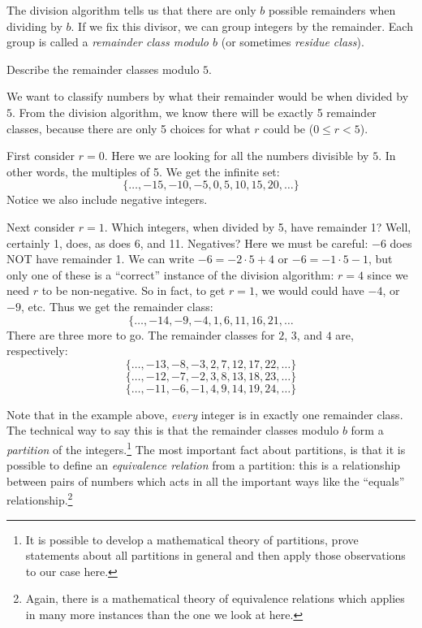\documentclass[12pt]{article}
\begin{document}
The division algorithm tells us that there are only $b$ possible remainders when dividing by $b$.  If we fix this divisor, we can group integers by the remainder. Each group is called a {\em remainder class modulo $b$} (or sometimes {\em residue class}). 

\begin{example}
	Describe the remainder classes modulo $5$.
	
	\begin{solution}
		We want to classify numbers by what their remainder would be when divided by $5$.  From the division algorithm, we know there will be exactly 5 remainder classes, because there are only 5 choices for what $r$ could be ($0 \le r < 5$).
		
		First consider $r = 0$.  Here we are looking for all the numbers divisible by $5$.  In other words, the multiples of 5.  We get the infinite set:
		\[\{\ldots, -15, -10, -5, 0, 5, 10, 15, 20, \ldots\}\]
		Notice we also include negative integers.
		
		Next consider $r = 1$.  Which integers, when divided by 5, have remainder 1?  Well, certainly 1, does, as does 6, and 11.  Negatives?  Here we must be careful: $-6$ does NOT have remainder 1.  We can write $-6 = -2\cdot 5 + 4$ or $-6 = -1 \cdot 5 - 1$, but only one of these is a ``correct'' instance of the division algorithm: $r = 4$ since we need $r$ to be non-negative.  So in fact, to get $r = 1$, we would could have $-4$, or $-9$, etc.  Thus we get the remainder class:
		\[\{\ldots, -14, -9, -4, 1, 6, 11, 16, 21, \ldots\]
		There are three more to go.  The remainder classes for $2$, $3$, and $4$ are, respectively:
		\[\{\ldots, -13, -8, -3, 2, 7, 12, 17, 22,\ldots\}\]
		\[\{\ldots, -12, -7, -2, 3, 8, 13, 18, 23, \ldots\}\]
		\[\{\ldots, -11, -6, -1, 4, 9, 14, 19, 24, \ldots\}\]
	\end{solution}
\end{example}

Note that in the example above, {\em every} integer is in exactly one remainder class.  The technical way to say this is that the remainder classes modulo $b$ form a {\em partition} of the integers.\footnote{It is possible to develop a mathematical theory of partitions, prove statements about all partitions in general and then apply those observations to our case here.} The most important fact about partitions, is that it is possible to define an {\em equivalence relation} from a partition: this is a relationship between pairs of numbers which acts in all the important ways like the ``equals'' relationship.\footnote{Again, there is a mathematical theory of equivalence relations which applies in many more instances than the one we look at here.}
\end{document}

